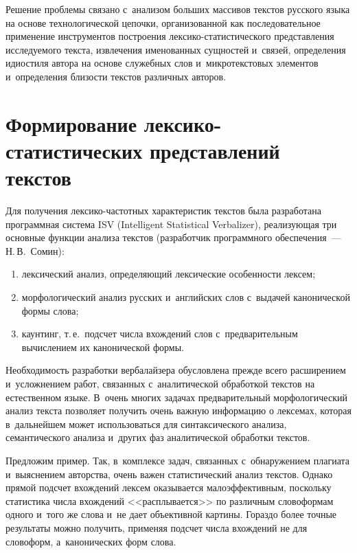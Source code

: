 \begin{multicols}{2}
     Решение проблемы связано с~анализом больших массивов текстов 
русского языка на основе технологической цепочки, организованной как 
последовательное применение инструментов построения  
лек\-си\-ко-ста\-ти\-сти\-че\-ско\-го представления ис\-сле\-ду\-емо\-го текс\-та, 
извлечения именованных сущностей и~связей, определения идиостиля автора 
на основе служебных слов и~микротекстовых элементов и~определения 
близости текстов различных авторов.
{

}
    
    \section{Формирование лексико-статистических 
представлений текстов}
     
     Для получения лексико-частотных характеристик текстов была 
разработана программная система ISV (Intelligent Statistical Verbalizer), 
реализующая три основные функции анализа текстов (разработчик 
программного обеспечения~--- Н.\,В.~Сомин):
     \begin{enumerate}[(1)]
     \item лексический анализ, определяющий лексические особенности 
лексем;
     \item морфологический анализ русских и~английских слов с~выдачей 
канонической формы слова;
     \item каунтинг, т.\,е.\ подсчет числа вхождений слов 
с~предварительным вычислением их канонической формы. 
     \end{enumerate}
     
     Необходимость разработки вербалайзера обусловлена прежде всего 
расширением и~усложнением работ, связанных с~аналитической обработкой 
текстов на естественном языке. В~очень многих задачах предварительный 
морфологический анализ текста позволяет получить очень важную 
информацию о лексемах, которая в~дальнейшем может использоваться для 
синтаксического анализа, семантического анализа и~других фаз 
аналитической обработки текстов. 
     
     Предложим пример. Так, в~комплексе задач, связанных 
с~обнаружением плагиата и~выяснением авторства, очень важен 
статистический анализ текстов. Однако прямой подсчет вхождений лексем 
оказывается малоэффективным, поскольку статистика числа вхождений 
<<расплывается>> по различным словоформам одного и~того же слова и~не 
дает объективной картины. Гораздо более точные результаты можно 
получить, применяя подсчет числа вхождений не для словоформ, 
а~канонических форм слова.
     

\end{multicols}
